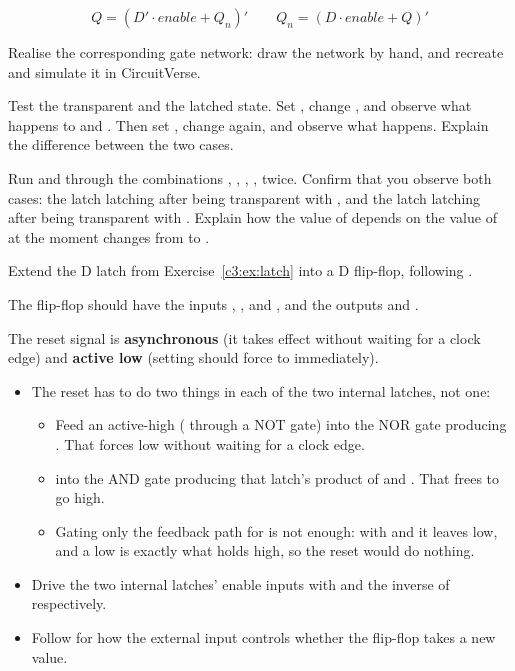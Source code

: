 \[ Q = (D' \cdot \mathit{enable} + Q_n)' \qquad Q_n = (D \cdot \mathit{enable} + Q)' \]

 Realise the corresponding gate network: draw the network by hand, and recreate and
simulate it in CircuitVerse.

 Test the transparent and the latched state. Set , change , and
observe what happens to  and . Then set , change  again,
and observe what happens. Explain the difference between the two cases.

 Run  and  through the combinations , , ,
, twice. Confirm that you observe both cases: the latch latching after being transparent
with , and the latch latching after being transparent with . Explain how
the value of  depends on the value of  at the moment  changes from
 to .


\label{c3:ex:dff}
Extend the D latch from Exercise~\ref{c3:ex:latch} into a D flip-flop, following
.

The flip-flop should have the inputs , ,  and , and
the outputs  and .

The reset signal is \textbf{asynchronous} (it takes effect without waiting for a clock edge) and
\textbf{active low} (setting  should force  to  immediately).

\begin{itemize}
  \item The reset has to do two things in each of the two internal latches, not one:
  \begin{itemize}
    \item Feed an active-high  ( through a NOT gate) into the NOR gate
      producing . That forces  low without waiting for a clock edge.
    \item {}  into the AND gate producing that latch's product of 
      and . That frees  to go high.
    \item Gating only the feedback path for  is not enough: with  and
       it leaves  low, and a low  is exactly what holds 
      high, so the reset would do nothing.
  \end{itemize}
  \item Drive the two internal latches' enable inputs with  and the inverse of
     respectively.
  \item Follow  for how the external  input controls whether the
    flip-flop takes a new value.
\end{itemize}

